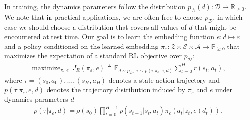 \documentclass{article}
\newcommand{\R}{\mathbb{R}}
\newcommand{\E}{\mathbb{E}}
\newcommand{\TODO}[1]{\textcolor{red}{\textbf{TODO: #1}}}
\newcommand{\cA}{\mathcal{A}}
\newcommand{\cS}{\mathcal{S}}
\DeclareMathOperator*{\maximize}{maximize}
\newcommand{\sysid}{dynamics}
\newcommand{\blind}{\emph{blind}}
\newcommand{\embedfn}{e}
\newcommand{\obset}{\mathcal{Z}}
\newcommand{\idset}{\mathcal{D}}
\newcommand{\obvar}{z}
\newcommand{\idvar}{d}
\newcommand{\idpdf}{p_{\idset}}
\newcommand{\latset}{\mathcal{E}}
\newcommand{\latvar}{\varepsilon}
\newtheorem{assumption}[theorem]{Assumption}
\begin{document}
In training, the \sysid{} parameters follow the distribution $\idpdf(\idvar) : \idset \mapsto \R_{\geq 0}$.
We note that in practical applications, we are often free to choose $\idpdf$,
in which case we should choose a distribution that covers all values of $\idvar$ that might be encountered at test time.
Our goal is to learn the embedding function $\embedfn: \idvar \mapsto \latvar$
and a policy conditioned on the learned embedding $\pi_\latvar: \obset \times \latset \times \cA \mapsto \R_{\geq 0}$
that maximizes the expectation of a standard RL objective over $\idpdf$:
\begin{equation}\begin{split}
\maximize_{\pi,\ \embedfn}\ J_R(\pi_\latvar, \embedfn) \triangleq \E_{\idvar \sim \idpdf,\ \tau \sim p(\tau|\pi_\latvar,\embedfn,\idvar)} \sum_{t = 0}^H
r(s_t, a_t),
\label{objective}
\end{split}\end{equation}
where $\tau = (s_0, a_0), \dots, (s_H, a_H)$ denotes a state-action trajectory and
$p(\tau | \pi_\latvar, \embedfn, \idvar)$ denotes the trajectory distribution induced by $\pi_\latvar$ and $\embedfn$ under \sysid{} parameters $\idvar$:
\begin{equation}\begin{split}
p(\tau | \pi_\latvar, \idvar) = \rho(s_0) \prod_{t=0}^{H-1} p(s_{t+1} | s_t, a_t) \pi_\latvar(a_t|\obvar_t, \embedfn(\idvar_t)).
\end{split}\end{equation}
\end{document}
